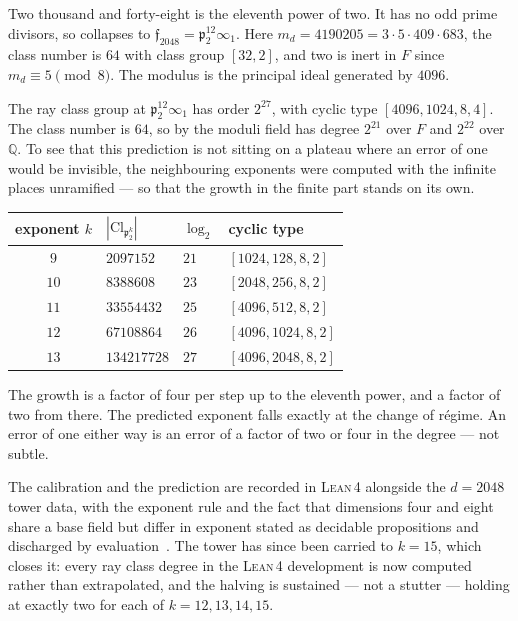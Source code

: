 \documentclass[12pt,a4paper]{article}
\newcommand{\Fd}{F}
\newcommand{\md}{m_d}
\newcommand{\pt}{\mathfrak{p}_2}
\newcommand{\Cl}{\mathrm{Cl}}
\newcommand{\Lean}{\textsc{Lean\,4}}
\begin{document}
Two thousand and forty-eight is the eleventh power of two. It has no odd prime divisors, so  collapses to $\mathfrak{f}_{2048} = \pt^{12}\infty_1$. Here $\md = 4190205 = 3\cdot 5\cdot 409\cdot 683$, the class number is $64$ with class group $[32,2]$, and two is inert in $\Fd$ since $\md \equiv 5 \pmod 8$. The modulus is the principal ideal generated by $4096$.

The ray class group at $\pt^{12}\infty_1$ has order $2^{27}$, with cyclic type $[4096,1024,8,4]$. The class number is $64$, so by  the moduli field has degree $2^{21}$ over $\Fd$ and $2^{22}$ over $\mathbb{Q}$. To see that this prediction is not sitting on a plateau where an error of one would be invisible, the neighbouring exponents were computed with the infinite places unramified — so that the growth in the finite part stands on its own.

\begin{center}
\begin{tabular}{@{}clll@{}}
\toprule
exponent $k$ & $|\Cl_{\pt^k}|$ & $\log_2$ & cyclic type \\
\midrule
$9$  & $2097152$   & $21$ & $[1024, 128, 8, 2]$ \\
$10$ & $8388608$   & $23$ & $[2048, 256, 8, 2]$ \\
$11$ & $33554432$  & $25$ & $[4096, 512, 8, 2]$ \\
$12$ & $67108864$  & $26$ & $[4096, 1024, 8, 2]$ \\
$13$ & $134217728$ & $27$ & $[4096, 2048, 8, 2]$ \\
\bottomrule
\end{tabular}
\end{center}

The growth is a factor of four per step up to the eleventh power, and a factor of two from there. The predicted exponent falls exactly at the change of r\'egime. An error of one either way is an error of a factor of two or four in the degree — not subtle.

The calibration and the prediction are recorded in \Lean{} alongside the $d=2048$ tower data, with the exponent rule and the fact that dimensions four and eight share a base field but differ in exponent stated as decidable propositions and discharged by evaluation~\cite{StarkHilbert12}. The tower has since been carried to $k=15$, which closes it: every ray class degree in the \Lean{} development is now computed rather than extrapolated, and the halving is sustained — not a stutter — holding at exactly two for each of $k=12,13,14,15$.
\end{document}
